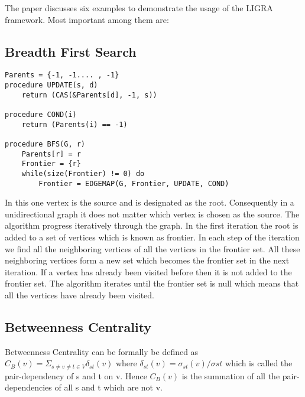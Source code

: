 \documentclass[a4paper,10pt,twoside]{article}
\begin{document}
The paper discusses six examples to demonstrate the usage of the LIGRA framework. Most important among them are:
\subsection{Breadth First Search}
\begin{lstlisting}Parents = {-1, -1.... , -1}
procedure UPDATE(s, d)
	return (CAS(&Parents[d], -1, s))

procedure COND(i)
	return (Parents(i) == -1)

procedure BFS(G, r)
	Parents[r] = r
	Frontier = {r}
	while(size(Frontier) != 0) do
		Frontier = EDGEMAP(G, Frontier, UPDATE, COND)
\end{lstlisting}

In this one vertex is the source and is designated as the root. Consequently in a unidirectional graph it does not matter which vertex is chosen as the source. The algorithm progress iteratively through the graph. In the first iteration the root is added to a set of vertices which is known as frontier. In each step of the iteration we find all the neighboring vertices of all the vertices in the frontier set. All these neighboring vertices form a new set which becomes the frontier set in the next iteration. If a vertex has already been visited before then it is not added to the frontier set. The algorithm iterates until the frontier set is null which means that all the vertices have already been visited.


\subsection{Betweenness Centrality}
Betweenness Centrality can be formally be defined as
$C_{B}(v) = \Sigma _{ s \neq v \neq t \in V } \delta _{st} (v)$
where $ \delta _{st} (v) = \sigma_{st}(v)/\sigma{st} $ which is called the pair-dependency of s and t on v.
Hence $C_{B}(v)$ is the summation of all the pair-dependencies of all s and t which are not v.
\end{document}
